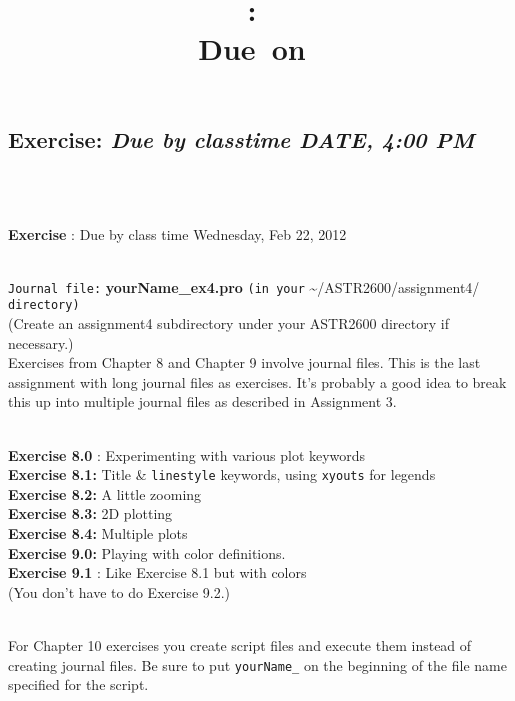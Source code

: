 \documentclass{article}
\title{\vspace{2in}\textmd{\textbf{\hmwkClass:\ \hmwkTitle}}\\\normalsize\vspace{0.1in}\small{Due\ on\ \hmwkDueDate}\\\vspace{0.1in}\large{}\vspace{3in}}
\date{}
\newcommand{\hmwkDueDate}{DATE, 4:00 PM}
\begin{document}
 \begin{spacing}{1.0}
 \newpage
 
 
 
 \section{\textbf{Exercise:} \emph{  Due by classtime \hmwkDueDate}}
 
 \\ 
  \par \\ 
  \textbf{Exercise} :   Due by class time Wednesday, Feb 22, 2012 \\ 
  \par \\ 
  \verb|Journal file:| \textbf{yourName\_ex4.pro} \verb|(in your| \textasciitilde{}/ASTR2600/assignment4/ \verb|directory)| \\ 
  (Create an assignment4 subdirectory under your ASTR2600 directory if necessary.) \\ 
  Exercises from Chapter 8 and Chapter 9 involve journal files.   This is the last assignment with long journal files as exercises.   It’s probably a good idea to break this up into multiple journal files as described in Assignment 3. \\ 
  \par \\ 
  \textbf{Exercise 8.0} : Experimenting with various plot keywords \\ 
  \textbf{Exercise 8.1:}  Title \&  \verb|linestyle|  keywords, using  \verb|xyouts|  for legends \\ 
  \textbf{Exercise 8.2:}  A little zooming \\ 
  \textbf{Exercise 8.3:}  2D plotting \\ 
  \textbf{Exercise 8.4:}  Multiple plots \\ 
  \textbf{Exercise 9.0:}  Playing with color definitions. \\ 
  \textbf{Exercise 9.1} : Like Exercise 8.1 but with colors \\ 
  (You don’t have to do Exercise 9.2.) \\ 
  \par \\ 
  For Chapter 10 exercises you create script files and execute them instead of creating journal files.   Be sure to put  \verb|yourName_|  on the beginning of the file name specified for the script. \\ 

\end{spacing}
\end{document}
